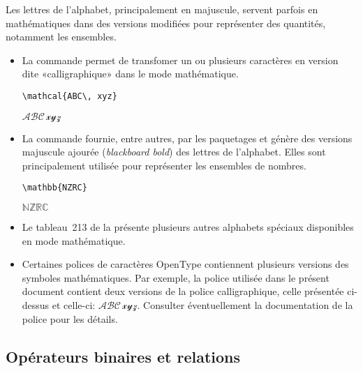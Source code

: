 Les lettres de l'alphabet, principalement en majuscule, servent
parfois en mathématiques dans des versions modifiées pour représenter
des quantités, notamment les ensembles.

\begin{itemize}
\item La commande \cmd{\mathcal} permet de transfomer un ou plusieurs
  caractères en version dite «calligraphique» dans le mode mathématique.
  \begin{demo}
    \begin{texample}
\begin{lstlisting}
\mathcal{ABC\, xyz}
\end{lstlisting}
      \producing
      $\mathscr{ABC\, xyz}$
    \end{texample}
  \end{demo}
\item La commande \cmd{\mathbb} fournie, entre autres, par les
  paquetages  et  génère des versions
  majuscule ajourée (\emph{blackboard bold}) des lettres de
  l'alphabet. Elles sont principalement utilisée pour représenter les
  ensembles de nombres.
  \begin{demo}
    \begin{texample}
\begin{lstlisting}
\mathbb{NZRC}
\end{lstlisting}
      \producing
      $\mathbb{NZRC}$
    \end{texample}
  \end{demo}
\item Le tableau~213 de la %
  présente plusieurs autres alphabets spéciaux disponibles en
  mode mathématique.
\item Certaines polices de caractères OpenType contiennent plusieurs
  versions des symboles mathématiques. Par exemple, la police utilisée
  dans le présent document contient deux versions de la police
  calligraphique, celle présentée ci-dessus et celle-ci: %
  $\mathscr{ABC\, xyz}$. Consulter éventuellement la documentation de
  la police pour les détails.
\end{itemize}

\subsection{Opérateurs binaires et relations}
\label{sec:math:symboles:binaires+relations}

